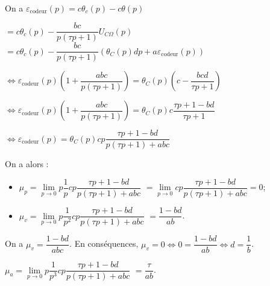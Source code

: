 \ifprof
\begin{corrige} ~\\

On a 
$\varepsilon_{\text{codeur}}(p)=c\theta_c(p)-c\theta(p)$ 

$=c\theta_c(p)-\dfrac{bc}{p\left(\tau p + 1 \right)}U_{C \Omega }(p)$
 $=c\theta_c(p)-\dfrac{bc}{p\left(\tau p + 1 \right)}\left( \theta_C(p) dp + a \varepsilon_{\text{codeur}}(p) \right)$

$\Leftrightarrow \varepsilon_{\text{codeur}}(p)\left(1+\dfrac{abc}{p\left(\tau p + 1 \right)}\right) = \theta_C(p)  \left(c-\dfrac{bcd}{\tau p + 1 } \right)$

$\Leftrightarrow \varepsilon_{\text{codeur}}(p)\left(1+\dfrac{abc}{p\left(\tau p + 1 \right)}\right) = \theta_C(p)  c \dfrac{\tau p + 1 -bd}{\tau p + 1 } $

$\Leftrightarrow \varepsilon_{\text{codeur}}(p) = \theta_C(p)  cp \dfrac{\tau p + 1 -bd}{p\left(\tau p + 1 \right)+abc} $

On a alors : 
\begin{itemize}
\item $\mu_p=\lim\limits_{p\to0}  p\dfrac{1}{p}  cp \dfrac{\tau p + 1 -bd}{p\left(\tau p + 1 \right)+abc}$ $=\lim\limits_{p\to0}  cp \dfrac{\tau p + 1 -bd}{p\left(\tau p + 1 \right)+abc}=0$;
\item $\mu_v=\lim\limits_{p\to0}  p\dfrac{1}{p^2}  cp \dfrac{\tau p + 1 -bd}{p\left(\tau p + 1 \right)+abc}$ 
$= \dfrac{1 -bd}{ab}$.
\end{itemize}

\end{corrige}
\else
\fi
  
\ifprof
\begin{corrige}
On a $\mu_v= \dfrac{1 -bd}{abc}$. En conséquences, $\mu_v=0 \Leftrightarrow  0=\dfrac{1 -bd}{ab} \Leftrightarrow d=\dfrac{1}{b}$.

$\mu_a=\lim\limits_{p\to0}  p\dfrac{1}{p^3}  cp \dfrac{\tau p + 1 -bd}{p\left(\tau p + 1 \right)+abc}$ 
$ =   \dfrac{\tau}{ab}$.

\end{corrige}
\else
\fi

